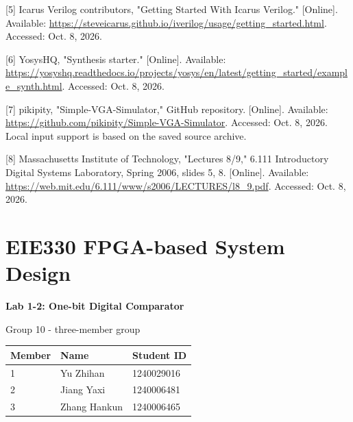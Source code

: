 \documentclass[10pt,a4paper]{article}
\begin{document}
{\small\raggedright [5] Icarus Verilog contributors, "Getting Started With Icarus Verilog." [Online]. Available: \url{https://steveicarus.github.io/iverilog/usage/getting_started.html}. Accessed: Oct. 8, 2026.\par}

{\small\raggedright [6] YosysHQ, "Synthesis starter." [Online]. Available: \url{https://yosyshq.readthedocs.io/projects/yosys/en/latest/getting_started/example_synth.html}. Accessed: Oct. 8, 2026.\par}

{\small\raggedright [7] pikipity, "Simple-VGA-Simulator," GitHub repository. [Online]. Available: \url{https://github.com/pikipity/Simple-VGA-Simulator}. Accessed: Oct. 8, 2026. Local input support is based on the saved source archive.\par}

{\small\raggedright [8] Massachusetts Institute of Technology, "Lectures 8/9," 6.111 Introductory Digital Systems Laboratory, Spring 2006, slides 5, 8. [Online]. Available: \url{https://web.mit.edu/6.111/www/s2006/LECTURES/l8_9.pdf}. Accessed: Oct. 8, 2026.\par}

\clearpage

\vspace*{65.1968503937008pt}

\section*{EIE330 FPGA-based System Design}

{\LARGE\bfseries Lab 1-2: One-bit Digital Comparator\par}\vspace{5mm}

Group 10 - three-member group\par

\vspace*{19.84251968503937pt}

\begingroup\small\setlength{\tabcolsep}{4pt}
\renewcommand{\arraystretch}{1.20}
\noindent\begin{tabular}{@{}p{}p{}p{}@{}}
\toprule
\textbf{Member} & \textbf{Name} & \textbf{Student ID} \\
\midrule
1 & Yu Zhihan & 1240029016 \\
2 & Jiang Yaxi & 1240006481 \\
3 & Zhang Hankun & 1240006465 \\
\bottomrule
\end{tabular}\par\endgroup
\vspace{2mm}
\end{document}
